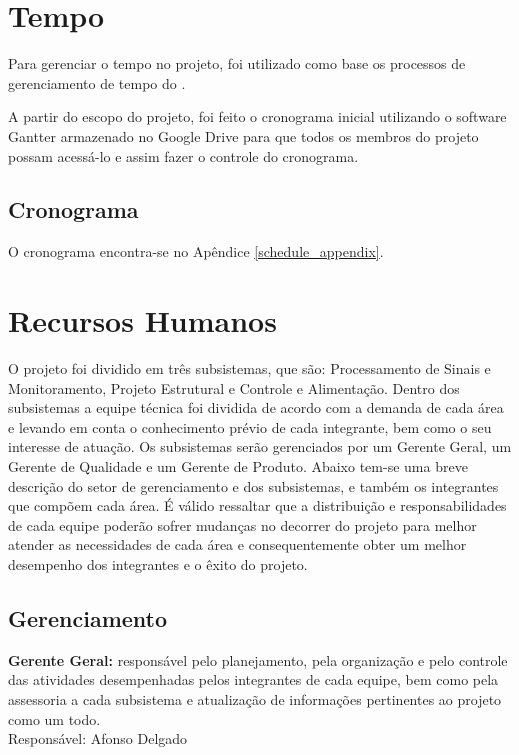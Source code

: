 \section{Tempo}

Para gerenciar o tempo no projeto, foi utilizado como base os processos
de gerenciamento de tempo do \cite{pmbok2012}.

A partir do escopo do projeto, foi feito o cronograma inicial utilizando o software Gantter armazenado no Google Drive para que todos os membros do projeto
possam acessá-lo e assim fazer o controle do cronograma.

\subsection{Cronograma}

O cronograma encontra-se no Apêndice \ref{schedule_appendix}.

\section{Recursos Humanos}

O projeto foi dividido em três subsistemas, que são: Processamento de Sinais e Monitoramento,
Projeto Estrutural e Controle e Alimentação. Dentro dos subsistemas a equipe
técnica foi dividida de acordo com a demanda de cada área e levando em conta o
conhecimento prévio de cada integrante, bem como o seu interesse de atuação. Os
subsistemas serão gerenciados por um Gerente Geral, um Gerente de Qualidade e
um Gerente de Produto.
Abaixo tem-se uma breve descrição do setor de gerenciamento e dos subsistemas,
e também os integrantes que compõem cada área. É válido ressaltar que a
distribuição e responsabilidades de cada equipe poderão sofrer mudanças no
decorrer do projeto para melhor atender as necessidades de cada área e
consequentemente obter um melhor desempenho dos integrantes e o êxito do projeto.

\subsection{Gerenciamento}

\textbf{Gerente Geral:} responsável pelo planejamento, pela organização e pelo controle das atividades desempenhadas pelos integrantes de cada equipe, bem como pela assessoria a cada subsistema e atualização de informações pertinentes ao projeto como um todo.
\\Responsável: Afonso Delgado

